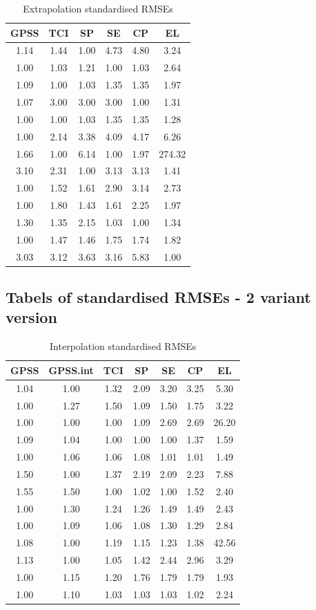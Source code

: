 \documentclass{article}
\begin{document}
\begin{table}
\begin{tabular}{|c|c|c|c|c|c|}
\hline
GPSS & TCI & SP & SE & CP & EL \\
\hline
1.14 & 1.44 & 1.00 & 4.73 & 4.80 & 3.24\\
1.00 & 1.03 & 1.21 & 1.00 & 1.03 & 2.64\\
1.09 & 1.00 & 1.03 & 1.35 & 1.35 & 1.97\\
1.07 & 3.00 & 3.00 & 3.00 & 1.00 & 1.31\\
1.00 & 1.00 & 1.03 & 1.35 & 1.35 & 1.28\\
1.00 & 2.14 & 3.38 & 4.09 & 4.17 & 6.26\\
1.66 & 1.00 & 6.14 & 1.00 & 1.97 & 274.32\\
3.10 & 2.31 & 1.00 & 3.13 & 3.13 & 1.41\\
1.00 & 1.52 & 1.61 & 2.90 & 3.14 & 2.73\\
1.00 & 1.80 & 1.43 & 1.61 & 2.25 & 1.97\\
1.30 & 1.35 & 2.15 & 1.03 & 1.00 & 1.34\\
1.00 & 1.47 & 1.46 & 1.75 & 1.74 & 1.82\\
3.03 & 3.12 & 3.63 & 3.16 & 5.83 & 1.00\\
\hline
\end{tabular}
\caption{Extrapolation standardised RMSEs}
\end{table}

\subsection{Tabels of standardised RMSEs - 2 variant version}

\begin{table}
\begin{tabular}{|c|c|c|c|c|c|c|}
\hline
GPSS & GPSS.int & TCI & SP & SE & CP & EL \\
\hline
1.04 & 1.00 & 1.32 & 2.09 & 3.20 & 3.25 & 5.30\\
1.00 & 1.27 & 1.50 & 1.09 & 1.50 & 1.75 & 3.22\\
1.00 & 1.00 & 1.00 & 1.09 & 2.69 & 2.69 & 26.20\\
1.09 & 1.04 & 1.00 & 1.00 & 1.00 & 1.37 & 1.59\\
1.00 & 1.06 & 1.06 & 1.08 & 1.01 & 1.01 & 1.49\\
1.50 & 1.00 & 1.37 & 2.19 & 2.09 & 2.23 & 7.88\\
1.55 & 1.50 & 1.00 & 1.02 & 1.00 & 1.52 & 2.40\\
1.00 & 1.30 & 1.24 & 1.26 & 1.49 & 1.49 & 2.43\\
1.00 & 1.09 & 1.06 & 1.08 & 1.30 & 1.29 & 2.84\\
1.08 & 1.00 & 1.19 & 1.15 & 1.23 & 1.38 & 42.56\\
1.13 & 1.00 & 1.05 & 1.42 & 2.44 & 2.96 & 3.29\\
1.00 & 1.15 & 1.20 & 1.76 & 1.79 & 1.79 & 1.93\\
1.00 & 1.10 & 1.03 & 1.03 & 1.03 & 1.02 & 2.24\\
\hline
\end{tabular}
\caption{Interpolation standardised RMSEs}
\end{table}
\end{document}
